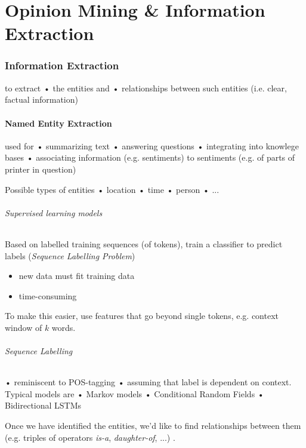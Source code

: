 \documentclass[10pt,twocolumn]{article}
\begin{document}
\pagebreak
\part{Opinion Mining \& Information Extraction}

\section{Information Extraction}

to extract  • the entities and  • relationships between such entities (i.e.
clear, factual information)

\subsection{Named Entity Extraction}

used for  • summarizing text  • answering questions  • integrating into knowlege
bases  • associating information (e.g. sentiments) to sentiments (e.g. of parts
of printer in question)

Possible types of entities  • location  • time  • person  • ...

\paragraph{\textit{Supervised learning models}} Based on labelled training
sequences (of tokens), train a classifier to predict labels (\textit{Sequence
  Labelling Problem})
\begin{itemize}
\item new data must fit training data
\item time-consuming
\end{itemize}

To make this easier, use features that go beyond single tokens, e.g. context
window of $k$ words.

\paragraph{\textit{Sequence Labelling}}  • reminiscent to POS-tagging  • assuming
that label is dependent on context. Typical models are  • Markov models  •
Conditional Random Fields  • Bidirectional LSTMs

Once we have identified the entities, we'd like to find relationships between
them (e.g. triples of operators \textit{is-a}, \textit{daughter-of}, ...)
.
\end{document}
